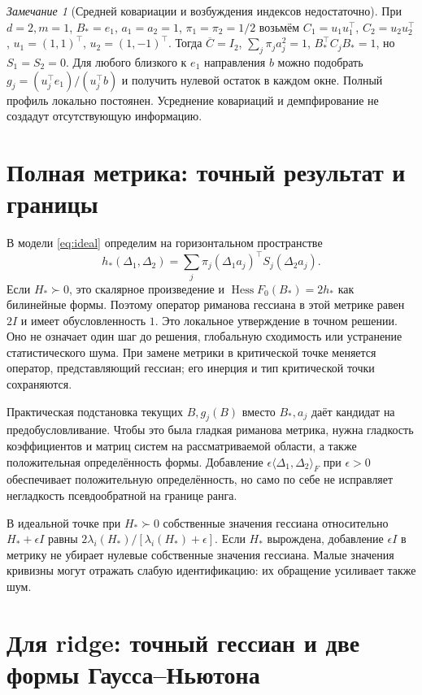\documentclass[11pt,a4paper]{article}
\newcommand{\Hess}{\operatorname{Hess}}
\newcommand{\inner}[2]{\langle#1,#2\rangle_F}
\theoremstyle{remark}
\newtheorem{remark}[theorem]{Замечание}
\begin{document}
\begin{remark}[Средней ковариации и возбуждения индексов недостаточно]
При $d=2,m=1$, $B_*=e_1$, $a_1=a_2=1$, $\pi_1=\pi_2=1/2$ возьмём
$C_1=u_1u_1^\top$, $C_2=u_2u_2^\top$, $u_1=(1,1)^\top$,
$u_2=(1,-1)^\top$. Тогда $\overline C=I_2$,
$\sum_j\pi_ja_j^2=1$, $B_*^\top C_jB_*=1$, но $S_1=S_2=0$.
Для любого близкого к $e_1$ направления $b$ можно подобрать
$g_j=(u_j^\top e_1)/(u_j^\top b)$ и получить нулевой остаток в каждом
окне. Полный профиль локально постоянен. Усреднение ковариаций и
демпфирование не создадут отсутствующую информацию.
\end{remark}

\section{Полная метрика: точный результат и границы}

В модели \eqref{eq:ideal} определим на горизонтальном пространстве
\[
 h_*(\Delta_1,\Delta_2)=
 \sum_j\pi_j(\Delta_1a_j)^\top S_j(\Delta_2a_j).
\]
Если $H_*\succ0$, это скалярное произведение и
$\Hess F_0(B_*)=2h_*$ как билинейные формы. Поэтому оператор
риманова гессиана в этой метрике равен $2I$ и имеет обусловленность $1$.
Это локальное утверждение в точном решении. Оно не означает один шаг
до решения, глобальную сходимость или устранение статистического шума.
При замене метрики в критической точке меняется оператор,
представляющий гессиан; его инерция и тип критической точки сохраняются.

Практическая подстановка текущих $B,g_j(B)$ вместо $B_*,a_j$ даёт
кандидат на предобусловливание. Чтобы это была гладкая риманова метрика,
нужна гладкость коэффициентов и матриц систем на рассматриваемой области,
а также положительная определённость формы. Добавление
$\epsilon\inner{\Delta_1}{\Delta_2}$ при $\epsilon>0$
обеспечивает положительную определённость, но само по себе не исправляет
негладкость псевдообратной на границе ранга.

В идеальной точке при $H_*\succ0$ собственные значения гессиана
относительно $H_*+\epsilon I$ равны
$2\lambda_i(H_*)/[\lambda_i(H_*)+\epsilon]$.
Если $H_*$ вырождена, добавление $\epsilon I$ в метрику не убирает
нулевые собственные значения гессиана. Малые значения кривизны могут
отражать слабую идентификацию: их обращение усиливает также шум.

\section{Для ridge: точный гессиан и две формы Гаусса--Ньютона}
\end{document}
